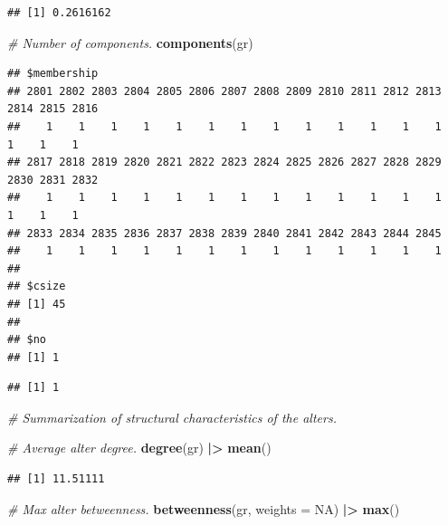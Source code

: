 \documentclass[
]{book}
\newenvironment{Shaded}{\begin{snugshade}}{\end{snugshade}}
\newcommand{\AttributeTok}[1]{\textcolor[rgb]{0.13,0.29,0.53}{#1}}
\newcommand{\CommentTok}[1]{\textcolor[rgb]{0.56,0.35,0.01}{\textit{#1}}}
\newcommand{\ConstantTok}[1]{\textcolor[rgb]{0.56,0.35,0.01}{#1}}
\newcommand{\FunctionTok}[1]{\textcolor[rgb]{0.13,0.29,0.53}{\textbf{#1}}}
\newcommand{\NormalTok}[1]{#1}
\newcommand{\SpecialCharTok}[1]{\textcolor[rgb]{0.81,0.36,0.00}{\textbf{#1}}}
\begin{document}
\begin{verbatim}
## [1] 0.2616162
\end{verbatim}

\begin{Shaded}
\begin{Highlighting}[]
\CommentTok{\# Number of components.}
\FunctionTok{components}\NormalTok{(gr)}
\end{Highlighting}
\end{Shaded}

\begin{verbatim}
## $membership
## 2801 2802 2803 2804 2805 2806 2807 2808 2809 2810 2811 2812 2813 2814 2815 2816 
##    1    1    1    1    1    1    1    1    1    1    1    1    1    1    1    1 
## 2817 2818 2819 2820 2821 2822 2823 2824 2825 2826 2827 2828 2829 2830 2831 2832 
##    1    1    1    1    1    1    1    1    1    1    1    1    1    1    1    1 
## 2833 2834 2835 2836 2837 2838 2839 2840 2841 2842 2843 2844 2845 
##    1    1    1    1    1    1    1    1    1    1    1    1    1 
## 
## $csize
## [1] 45
## 
## $no
## [1] 1
\end{verbatim}

\begin{Shaded}
\end{Shaded}

\begin{verbatim}
## [1] 1
\end{verbatim}

\begin{Shaded}
\begin{Highlighting}[]
\CommentTok{\# Summarization of structural characteristics of the alters.}

\CommentTok{\# Average alter degree.}
\FunctionTok{degree}\NormalTok{(gr) }\SpecialCharTok{|\textgreater{}} \FunctionTok{mean}\NormalTok{()}
\end{Highlighting}
\end{Shaded}

\begin{verbatim}
## [1] 11.51111
\end{verbatim}

\begin{Shaded}
\begin{Highlighting}[]
\CommentTok{\# Max alter betweenness.}
\FunctionTok{betweenness}\NormalTok{(gr, }\AttributeTok{weights =} \ConstantTok{NA}\NormalTok{) }\SpecialCharTok{|\textgreater{}} \FunctionTok{max}\NormalTok{()}
\end{Highlighting}
\end{Shaded}
\end{document}
